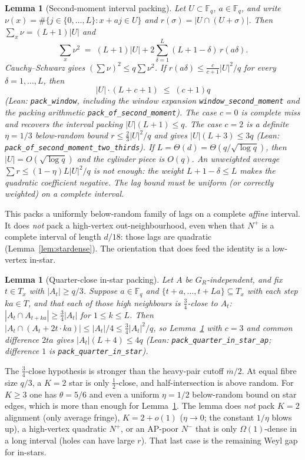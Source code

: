 \documentclass[11pt]{article}
\newtheorem{lemma}[theorem]{Lemma}
\theoremstyle{definition}
\newcommand{\F}{\mathbb{F}}
\begin{document}
\begin{lemma}[Second-moment interval packing]\label{lem:2ndmoment}
Let $U\subset\F_q$, $a\in\F_q$, and write
$\nu(x)=\#\{j\in\{0,\dots,L\}:x+aj\in U\}$ and
$r(\sigma)=|U\cap(U+\sigma)|$.
Then $\sum_x\nu=(L+1)|U|$ and
\[
  \sum_x\nu^{2}\;=\;(L+1)|U|+2\sum_{\delta=1}^{L}(L+1-\delta)\,r(a\delta).
\]
Cauchy--Schwarz gives $(\sum\nu)^{2}\le q\sum\nu^{2}$.
If $r(a\delta)\le\frac{c}{c+1}|U|^{2}/q$ for every $\delta=1,\dots,L$,
then
\[
  |U|\cdot(L+c+1)\;\le\;(c+1)q
\]
(Lean: \texttt{pack\_window}, including the window expansion
\texttt{window\_second\_moment} and the packing arithmetic
\texttt{pack\_of\_second\_moment}).
The case $c=0$ is complete miss and recovers the interval packing
$|U|(L+1)\le q$.
The case $c=2$ is a definite $\eta=1/3$ below-random bound
$r\le\tfrac23|U|^{2}/q$ and gives $|U|(L+3)\le 3q$
(Lean: \texttt{pack\_of\_second\_moment\_two\_thirds}).
If $L=\Theta(d)=\Theta(q/\sqrt{\log q})$, then $|U|=O(\sqrt{\log q})$
and the cylinder piece is $O(q)$.
An unweighted average $\sum r\le(1-\eta)L|U|^{2}/q$ is not enough:
the weight $L+1-\delta\le L$ makes the quadratic coefficient negative.
The lag bound must be uniform (or correctly weighted) on a complete
interval.
\end{lemma}

This packs a uniformly below-random family of lags on a complete
\emph{affine} interval. It does \emph{not} pack a high-vertex
out-neighbourhood, even when that $N^+$ is a complete interval of
length $d/18$: those lags are quadratic
(Lemma~\ref{lem:stardense}).
The orientation that does feed the identity is a low-vertex in-star.

\begin{lemma}[Quarter-close in-star packing]\label{lem:instar}
Let $A$ be $G_R$-independent, and fix $t\in T_x$ with $|A_t|\ge q/3$.
Suppose $a\in\F_q$ and $\{t+a,\dots,t+La\}\subseteq T_x$ with each
step $ka\in T$, and that each of those high neighbours is
$\tfrac34$-close to $A_t$:
$|A_t\cap A_{t+ka}|\ge\tfrac34|A_t|$ for $1\le k\le L$.
Then $|A_t\cap(A_t+2t\cdot ka)|\le|A_t|/4\le\tfrac34|A_t|^{2}/q$, so
Lemma~\ref{lem:2ndmoment} with $c=3$ and common difference $2ta$ gives
$|A_t|(L+4)\le 4q$
(Lean: \texttt{pack\_quarter\_in\_star\_ap};
difference $1$ is \texttt{pack\_quarter\_in\_star}).
\end{lemma}

The $\tfrac34$-close hypothesis is stronger than the heavy-pair cutoff
$\overline m/2$. At equal fibre size $q/3$, a $K=2$ star is only
$\tfrac12$-close, and half-intersection is above random.
For $K\ge 3$ one has $\theta=5/6$ and even a uniform $\eta=1/2$
below-random bound on star edges, which is more than enough for
Lemma~\ref{lem:instar}.
The lemma does \emph{not} pack $K=2$ alignment (only average fringe),
$K=2+o(1)$ ($\eta\to 0$; the constant $1/\eta$ blows up), a
high-vertex quadratic $N^+$, or an AP-poor $N^-$ that is only
$\Omega(1)$-dense in a long interval (holes can have large $r$).
That last case is the remaining Weyl gap for in-stars.
\end{document}
